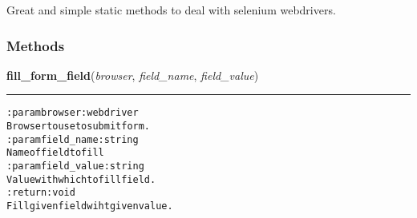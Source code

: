     \label{hal:internet:selenium:SeleniumForm}
Great and simple static methods to deal with selenium webdrivers.



  \subsubsection{Methods}

    \label{hal:internet:selenium:SeleniumForm:fill_form_field}

    \vspace{0.5ex}

\hspace{.8\funcindent}\begin{boxedminipage}{\funcwidth}

    \raggedright \textbf{fill\_form\_field}(\textit{browser}, \textit{field\_name}, \textit{field\_value})

    \vspace{-1.5ex}

    \rule{\textwidth}{0.5\fboxrule}
\setlength{\parskip}{2ex}
\begin{alltt}

:param browser: webdriver
    Browser to use to submit form.
:param field\_name :string
    Name of field to fill
:param field\_value: string
    Value with which to fill field.
:return: void
    Fill given field wiht given value.
\end{alltt}

\setlength{\parskip}{1ex}
    \end{boxedminipage}

    \label{hal:internet:selenium:SeleniumForm:fill_login_form}

    \vspace{0.5ex}

